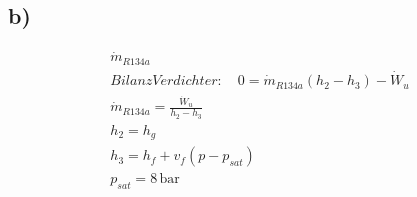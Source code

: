 

\subsection*{b)}

\begin{align*}
\dot{m}_{R134a} \\
Bilanz Verdichter: \quad 0 = \dot{m}_{R134a} (h_2 - h_3) - \dot{W}_u \\
\dot{m}_{R134a} = \frac{\dot{W}_u}{h_2 - h_3} \\
h_2 = h_g \\
h_3 = h_f + v_f \left( p - p_{sat} \right) \\
p_{sat} = 8 \, \text{bar}
\end{align*}